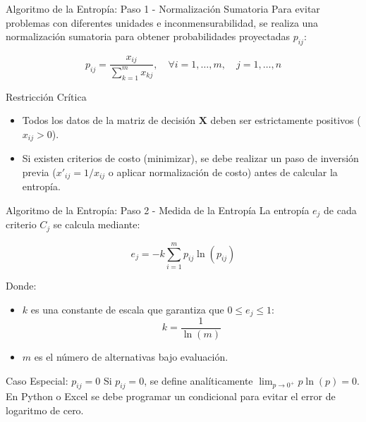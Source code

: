 \documentclass[aspectratio=169, 10pt]{beamer}
\begin{document}
\begin{frame}{Algoritmo de la Entropía: Paso 1 - Normalización Sumatoria}
    Para evitar problemas con diferentes unidades e inconmensurabilidad, se realiza una normalización sumatoria para obtener probabilidades proyectadas $p_{ij}$:
    
    \[ p_{ij} = \frac{x_{ij}}{\sum_{k=1}^{m} x_{kj}}, \quad \forall i=1,\dots,m, \quad j=1,\dots,n \]
    
    \begin{alertblock}{Restricción Crítica}
        \scriptsize
        \begin{itemize}
            \item Todos los datos de la matriz de decisión $\mathbf{X}$ deben ser estrictamente positivos ($x_{ij} > 0$).
            \item Si existen criterios de costo (minimizar), se debe realizar un paso de inversión previa ($x'_{ij} = 1/x_{ij}$ o aplicar normalización de costo) antes de calcular la entropía.
        \end{itemize}
    \end{alertblock}
\end{frame}

\begin{frame}{Algoritmo de la Entropía: Paso 2 - Medida de la Entropía}
    La entropía $e_j$ de cada criterio $C_j$ se calcula mediante:
    
    \[ e_j = -k \sum_{i=1}^{m} p_{ij} \ln(p_{ij}) \]
    
    Donde:
    \begin{itemize}
        \item $k$ es una constante de escala que garantiza que $0 \le e_j \le 1$:
        \[ k = \frac{1}{\ln(m)} \]
        \item $m$ es el número de alternativas bajo evaluación.
    \end{itemize}
    
    \begin{exampleblock}{Caso Especial: $p_{ij} = 0$}
        \scriptsize
        Si $p_{ij} = 0$, se define analíticamente $\lim_{p \to 0^+} p \ln(p) = 0$. En Python o Excel se debe programar un condicional para evitar el error de logaritmo de cero.
    \end{exampleblock}
\end{frame}
\end{document}
